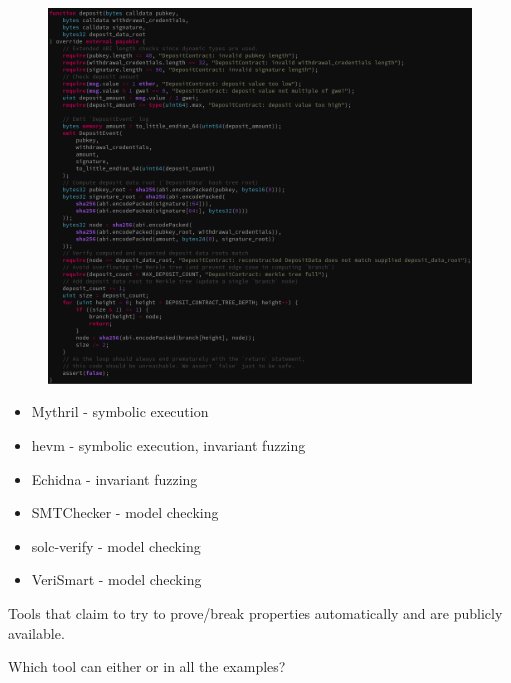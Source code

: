 \documentclass[aspectratio=169,10pt]{beamer}
\begin{document}
\begin{frame}[fragile]
\begin{center}
\begin{figure}
	\includegraphics[scale=0.25]{images/deposit_pass}
\end{figure}
\end{center}
\end{frame}

\begin{frame}[fragile]
\begin{center}
\begin{itemize}
\item Mythril - symbolic execution
\item hevm - symbolic execution, invariant fuzzing
\item Echidna - invariant fuzzing
\item SMTChecker - model checking
\item solc-verify - model checking
\item VeriSmart - model checking
\end{itemize}
Tools that claim to try to prove/break properties automatically and are publicly available.
\end{center}
\end{frame}

\begin{frame}[fragile]
\begin{center}
Which tool can either {\color{green}{prove correctness}} or {\color{red}{find bugs}} in all the examples?
\end{center}
\end{frame}
\end{document}
